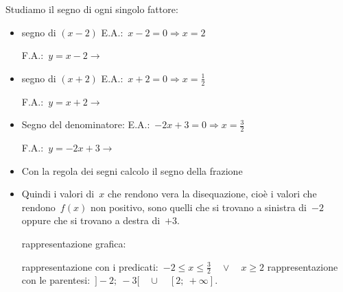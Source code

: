 \begin{exrig}
\begin{esempio}
Studiamo il segno di ogni singolo fattore:
\begin{itemize}
 \item segno di $(x-2)$
 \subitem E.A.:~$x-2=0 \Rightarrow x=2$
 \subitem
  \begin{minipage}{.25\textwidth}
   F.A.:~$y=x-2 \rightarrow $
  \end{minipage}
  \begin{minipage}{.30\textwidth}
\begin{inaccessibleblock}
  
\end{inaccessibleblock}
  \end{minipage}
 \item segno di $(x+2)$
 \subitem E.A.:~$x+2=0 \Rightarrow x=\frac{1}{2}$
 \subitem
  \begin{minipage}{.25\textwidth}
   F.A.:~$y=x+2 \rightarrow $
  \end{minipage}
  \begin{minipage}{.30\textwidth}
\begin{inaccessibleblock}
  
\end{inaccessibleblock}
  \end{minipage}
 \item Segno del denominatore:
 \subitem E.A.:~$-2x+3=0 \Rightarrow x=\frac{3}{2}$
 \subitem
  \begin{minipage}{.25\textwidth}
   F.A.:~$y=-2x+3 \rightarrow $
  \end{minipage}
  \begin{minipage}{.30\textwidth}
\begin{inaccessibleblock}
  
\end{inaccessibleblock}
  \end{minipage}
 \item Con la regola dei segni calcolo il segno della frazione 
\begin{inaccessibleblock}
   
\end{inaccessibleblock}
 \item Quindi i valori di~$x$ che rendono vera la disequazione, cioè i valori
  che rendono~$f(x)$ non positivo, sono quelli 
  che si trovano a sinistra di~$-2$ oppure che si trovano a destra di~$+3$. 
 \subitem 
  \begin{minipage}{.35\textwidth}
   rappresentazione grafica: 
  \end{minipage}
  \begin{minipage}{.30\textwidth}
\begin{inaccessibleblock}
   
\end{inaccessibleblock}
  \end{minipage}
 \subitem rappresentazione con i 
   predicati:~$-2 \le x \le \frac{3}{2} \quad \lor \quad x \ge 2$ 
 \subitem rappresentazione con le 
  parentesi:~$]-2;~-3[ \quad \cup \quad [2;~+\infty]$. 
\end{itemize}


\end{esempio}
\end{exrig}
